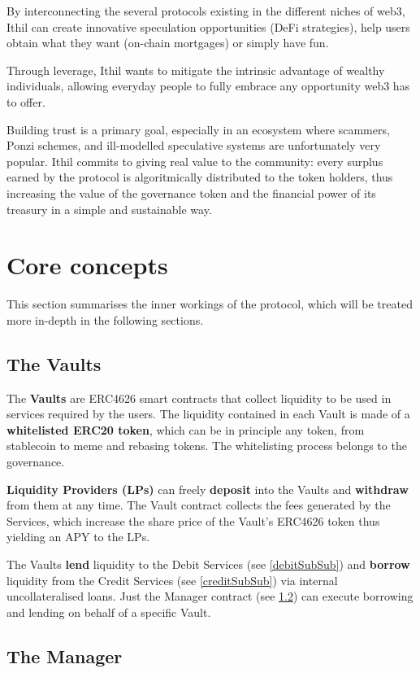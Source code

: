 \documentclass[a4paper,10 pt]{article}
\theoremstyle{definition}
\begin{document}
By interconnecting the several protocols existing in the different niches of web3, Ithil can create innovative speculation opportunities (DeFi strategies), help users obtain what they want (on-chain mortgages) or simply have fun.

Through leverage, Ithil wants to mitigate the intrinsic advantage of wealthy individuals, allowing everyday people to fully embrace any opportunity web3 has to offer.

Building trust is a primary goal, especially in an ecosystem where scammers, Ponzi schemes, and ill-modelled speculative systems are unfortunately very popular. Ithil commits to giving real value to the community: every surplus earned by the protocol is algoritmically distributed to the token holders, thus increasing the value of the governance token and the financial power of its treasury in a simple and sustainable way.

\newpage

\section{Core concepts}
This section summarises the inner workings of the protocol, which will be treated more in-depth in the following sections. 
\subsection{The Vaults}\label{vaultSub}
The {\bf Vaults} are ERC4626 smart contracts that collect liquidity to be used in services required by the users. The liquidity contained in each Vault is made of a {\bf whitelisted ERC20 token}, which can be in principle any token, from stablecoin to meme and rebasing tokens. The whitelisting process belongs to the governance.

{\bf Liquidity Providers (LPs)} can freely {\bf deposit} into the Vaults and {\bf withdraw} from them at any time. The Vault contract collects the fees generated by the Services, which increase the share price of the Vault's ERC4626 token thus yielding an APY to the LPs.

The Vaults {\bf lend} liquidity to the Debit Services (see \ref{debitSubSub}) and {\bf borrow} liquidity from the Credit Services (see \ref{creditSubSub}) via internal uncollateralised loans. Just the Manager contract (see \ref{managerSub}) can execute borrowing and lending on behalf of a specific Vault.

\subsection{The Manager}\label{managerSub}
\end{document}
